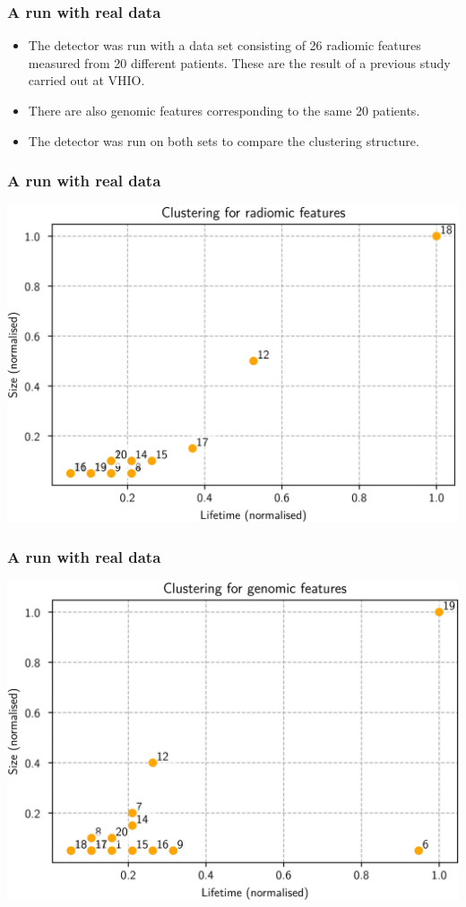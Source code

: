 \documentclass[xcolor=dvipsnames]{beamer}
\begin{document}
\begin{frame}
	\frametitle{A run with real data}
	\begin{itemize}
		\item The detector was run with a data set consisting of 26 radiomic features measured
			from 20 different patients. These are the result of a previous study carried out at
			VHIO. \pause
		\item There are also genomic features corresponding to the same 20 patients. \pause
		\item The detector was run on both sets to compare the clustering structure. 
	\end{itemize}
\end{frame}

\begin{frame}
	\frametitle{A run with real data}
	\centering
	\includegraphics[width = \textwidth]{beamer/radiomic}
\end{frame}

\begin{frame}
	\frametitle{A run with real data}
	\centering
	\includegraphics[width = \textwidth]{beamer/genomic}
\end{frame}
\end{document}
